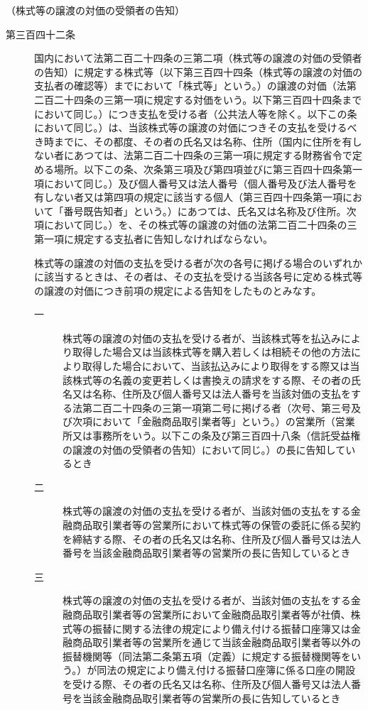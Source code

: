 \documentclass[twocolumn,a4j,10pt]{ltjtarticle}
\begin{document}
\noindent\hspace{10pt}（株式等の譲渡の対価の受領者の告知）
\begin{description}
\item[第三百四十二条]国内において法第二百二十四条の三第二項（株式等の譲渡の対価の受領者の告知）に規定する株式等（以下第三百四十四条（株式等の譲渡の対価の支払者の確認等）までにおいて「株式等」という。）の譲渡の対価（法第二百二十四条の三第一項に規定する対価をいう。以下第三百四十四条までにおいて同じ。）につき支払を受ける者（公共法人等を除く。以下この条において同じ。）は、当該株式等の譲渡の対価につきその支払を受けるべき時までに、その都度、その者の氏名又は名称、住所（国内に住所を有しない者にあつては、法第二百二十四条の三第一項に規定する財務省令で定める場所。以下この条、次条第三項及び第四項並びに第三百四十四条第一項において同じ。）及び個人番号又は法人番号（個人番号及び法人番号を有しない者又は第四項の規定に該当する個人（第三百四十四条第一項において「番号既告知者」という。）にあつては、氏名又は名称及び住所。次項において同じ。）を、その株式等の譲渡の対価の法第二百二十四条の三第一項に規定する支払者に告知しなければならない。
\item[]株式等の譲渡の対価の支払を受ける者が次の各号に掲げる場合のいずれかに該当するときは、その者は、その支払を受ける当該各号に定める株式等の譲渡の対価につき前項の規定による告知をしたものとみなす。
\begin{description}
\item[一]株式等の譲渡の対価の支払を受ける者が、当該株式等を払込みにより取得した場合又は当該株式等を購入若しくは相続その他の方法により取得した場合において、当該払込みにより取得をする際又は当該株式等の名義の変更若しくは書換えの請求をする際、その者の氏名又は名称、住所及び個人番号又は法人番号を当該対価の支払をする法第二百二十四条の三第一項第二号に掲げる者（次号、第三号及び次項において「金融商品取引業者等」という。）の営業所（営業所又は事務所をいう。以下この条及び第三百四十八条（信託受益権の譲渡の対価の受領者の告知）において同じ。）の長に告知しているとき
\item[二]株式等の譲渡の対価の支払を受ける者が、当該対価の支払をする金融商品取引業者等の営業所において株式等の保管の委託に係る契約を締結する際、その者の氏名又は名称、住所及び個人番号又は法人番号を当該金融商品取引業者等の営業所の長に告知しているとき
\item[三]株式等の譲渡の対価の支払を受ける者が、当該対価の支払をする金融商品取引業者等の営業所において金融商品取引業者等が社債、株式等の振替に関する法律の規定により備え付ける振替口座簿又は金融商品取引業者等の営業所を通じて当該金融商品取引業者等以外の振替機関等（同法第二条第五項（定義）に規定する振替機関等をいう。）が同法の規定により備え付ける振替口座簿に係る口座の開設を受ける際、その者の氏名又は名称、住所及び個人番号又は法人番号を当該金融商品取引業者等の営業所の長に告知しているとき

\end{description}
\end{description}
\end{document}
